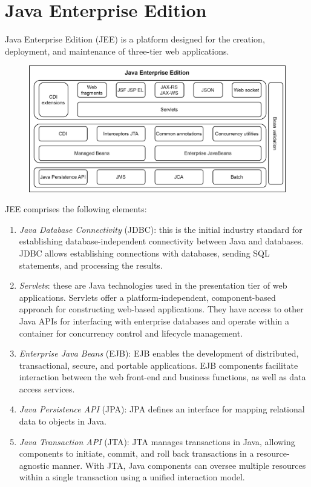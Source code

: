 \section{Java Enterprise Edition}

Java Enterprise Edition (JEE) is a platform designed for the creation, deployment, and maintenance of three-tier web applications.
\begin{figure}[H]
    \centering
    \includegraphics[width=0.75\linewidth]{images/jee.png}
\end{figure}
JEE comprises the following elements:
\begin{enumerate}
    \item \textit{Java Database Connectivity} (JDBC): this is the initial industry standard for establishing database-independent connectivity between Java and databases. 
        JDBC allows establishing connections with databases, sending SQL statements, and processing the results.
    \item \textit{Servlets}: these are Java technologies used in the presentation tier of web applications. 
        Servlets offer a platform-independent, component-based approach for constructing web-based applications. 
        They have access to other Java APIs for interfacing with enterprise databases and operate within a container for concurrency control and lifecycle management.
    \item \textit{Enterprise Java Beans} (EJB): EJB enables the development of distributed, transactional, secure, and portable applications.
        EJB components facilitate interaction between the web front-end and business functions, as well as data access services.
    \item \textit{Java Persistence API} (JPA): JPA defines an interface for mapping relational data to objects in Java.
    \item \textit{Java Transaction API} (JTA): JTA manages transactions in Java, allowing components to initiate, commit, and roll back transactions in a resource-agnostic manner. 
        With JTA, Java components can oversee multiple resources within a single transaction using a unified interaction model.
\end{enumerate}